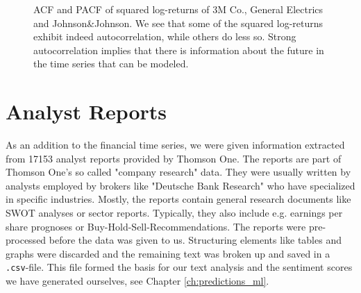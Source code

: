 \begin{figure}[H]
    \centering
    \begin{adjustbox}{width=.95\textwidth,center}
    
    \end{adjustbox}
    \begin{adjustbox}{width=.95\textwidth,center}
    
    \end{adjustbox}  
    \begin{adjustbox}{width=.95\textwidth,center}
    
    \end{adjustbox}  
    \caption{ACF and PACF of squared log-returns of 3M Co., General Electrics and Johnson\&Johnson. We see that some of the squared log-returns exhibit indeed autocorrelation, while others do less so. Strong autocorrelation implies that there is information about the future in the time series that can be modeled.}
    \label{fig:ACF_selected_squared_log_returns}
\end{figure}


\section{Analyst Reports}
As an addition to the financial time series, we were given information extracted from 17153 analyst reports provided by Thomson One. The reports are part of Thomson One's so called "company research" data. They were usually written by analysts employed by brokers like "Deutsche Bank Research" who have specialized in specific industries. Mostly, the reports contain general research documents like SWOT analyses or sector reports. Typically, they also include e.g. earnings per share prognoses or Buy-Hold-Sell-Recommendations. The reports were pre-processed before the data was given to us. Structuring elements like tables and graphs were discarded and the remaining text was broken up and saved in a \texttt{.csv}-file. This file formed the basis for our text analysis and the sentiment scores we have generated ourselves, see Chapter \ref{ch:predictions_ml}. 

